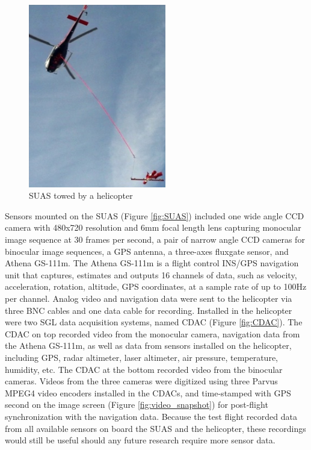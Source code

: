 \begin{figure}[h]
\includegraphics[width=6cm,keepaspectratio=true]{./Figures/towed_SUAS.jpg}
\caption{SUAS towed by a helicopter}
\label{fig:towedSUAS}
\end{figure}
\FloatBarrier

Sensors mounted on the SUAS (Figure \ref{fig:SUAS}) included one wide
angle CCD camera with 480x720 resolution and 6mm focal length lens
capturing monocular image sequence at 30 frames per second, a pair of
narrow angle CCD cameras for binocular image sequences, a GPS antenna,
a three-axes fluxgate sensor, and Athena GS-111m. The Athena GS-111m
is a flight control INS/GPS navigation unit \cite{_athena_????} that
captures, estimates and outputs 16 channels of data, such as velocity,
acceleration, rotation, altitude, GPS coordinates, at a sample rate of
up to 100Hz per channel. Analog video and navigation data were sent to
the helicopter via three BNC cables and one data cable for recording.
Installed in the helicopter were two SGL data acquisition systems,
named CDAC (Figure \ref{fig:CDAC}). The CDAC on top recorded video
from the monocular camera, navigation data from the Athena GS-111m, as
well as data from sensors installed on the helicopter, including GPS,
radar altimeter, laser altimeter, air pressure, temperature, humidity,
etc. The CDAC at the bottom recorded video from the binocular cameras.
Videos from the three cameras were digitized using three Parvus MPEG4
video encoders installed in the CDACs, and time-stamped with GPS
second on the image screen (Figure \ref{fig:video_snapshot}) for
post-flight synchronization with the navigation data. Because the test
flight recorded data from all available sensors on board the SUAS and
the helicopter, these recordings would still be useful should any
future research require more sensor data.

